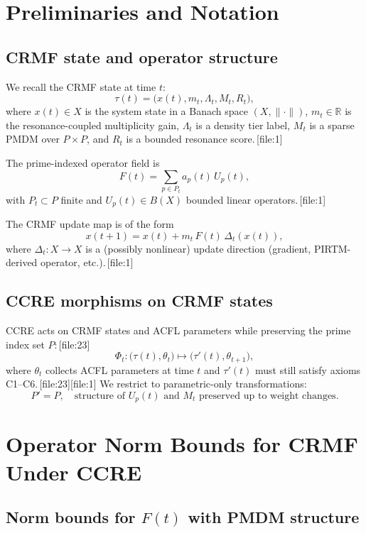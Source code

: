 \documentclass[11pt]{article}
\begin{document}
\section{Preliminaries and Notation}

\subsection{CRMF state and operator structure}

We recall the CRMF state at time $t$:
\[
  \tau(t) = \bigl(x(t), m_t, \Lambda_t, M_t, R_t\bigr),
\]
where $x(t)\in X$ is the system state in a Banach space $(X,\|\cdot\|)$, $m_t\in\mathbb{R}$ is the resonance-coupled multiplicity gain, $\Lambda_t$ is a density tier label, $M_t$ is a sparse PMDM over $P\times P$, and $R_t$ is a bounded resonance score.\,[file:1]

The prime-indexed operator field is
\[
  F(t) = \sum_{p\in P_t} a_p(t)\,U_p(t),
\]
with $P_t\subset P$ finite and $U_p(t)\in B(X)$ bounded linear operators.\,[file:1]

The CRMF update map is of the form
\[
  x(t+1) = x(t) + m_t\,F(t)\,\Delta_t(x(t)),
\]
where $\Delta_t : X\to X$ is a (possibly nonlinear) update direction (gradient, PIRTM-derived operator, etc.).\,[file:1]

\subsection{CCRE morphisms on CRMF states}

CCRE acts on CRMF states and ACFL parameters while preserving the prime index set $P$:\,[file:23]
\begin{equation}
  \Phi_t: \bigl(\tau(t), \theta_t\bigr) \mapsto \bigl(\tau'(t), \theta_{t+1}\bigr),
\end{equation}
where $\theta_t$ collects ACFL parameters at time $t$ and $\tau'(t)$ must still satisfy axioms C1--C6.\,[file:23][file:1]
We restrict to parametric-only transformations:
\[
  P' = P,\quad \text{structure of }U_p(t)\text{ and }M_t\text{ preserved up to weight changes}.
\]

\section{Operator Norm Bounds for CRMF Under CCRE}

\subsection{Norm bounds for $F(t)$ with PMDM structure}
\end{document}
